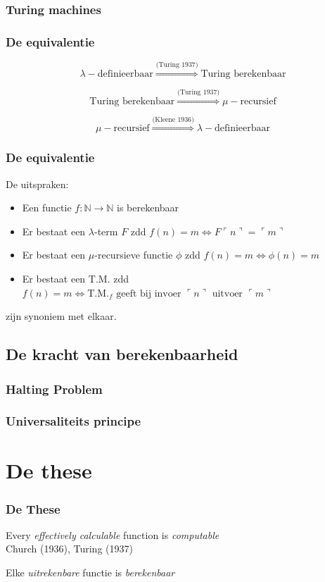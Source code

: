 \documentclass{beamer}
\begin{document}
\begin{frame}
    \frametitle{Turing machines}
\end{frame}

\begin{frame}
    \frametitle{De equivalentie}

    $$\lambda-\text{definieerbaar} \stackrel{\scriptscriptstyle \text{(Turing 1937)}}{\Longrightarrow} \text{Turing berekenbaar}$$

    $$\text{Turing berekenbaar} \stackrel{\scriptscriptstyle \text{(Turing 1937)}}{\Longrightarrow} \mu-\text{recursief} $$

    $$\mu-\text{recursief} \stackrel{\scriptscriptstyle \text{(Kleene 1936)}}{\Longrightarrow} \lambda-\text{definieerbaar} $$
\end{frame}

\begin{frame}
    \frametitle{De equivalentie}

    De uitspraken:
    \begin{itemize}
        \item Een functie $f:\mathbb{N} \rightarrow \mathbb{N}$ is berekenbaar
        \item Er bestaat een $\lambda$-term $F$ zdd $f(n) = m \Leftrightarrow F \ulcorner n\urcorner = \ulcorner m\urcorner $
        \item Er bestaat een $\mu$-recursieve functie $\phi$ zdd $f(n) = m \Leftrightarrow \phi(n) = m$
        \item Er bestaat een T.M. zdd $f(n) = m \Leftrightarrow \text{T.M.}_f \text{ geeft bij invoer } \ulcorner n\urcorner \text{ uitvoer } \ulcorner m\urcorner$
    \end{itemize}

    zijn synoniem met elkaar.
\end{frame}

\subsection{De kracht van berekenbaarheid}
\begin{frame}
    \frametitle{Halting Problem}
\end{frame}

\begin{frame}
    \frametitle{Universaliteits principe}
\end{frame}

\section{De these}
\begin{frame}
    \frametitle{De These}
    \begin{center}
        {\Large
            Every \emph{effectively calculable} function is \emph{computable}
        }
        \\
        Church (1936), Turing (1937)

        Elke \emph{uitrekenbare} functie is \emph{berekenbaar}
    \end{center}
\end{frame}
\end{document}
